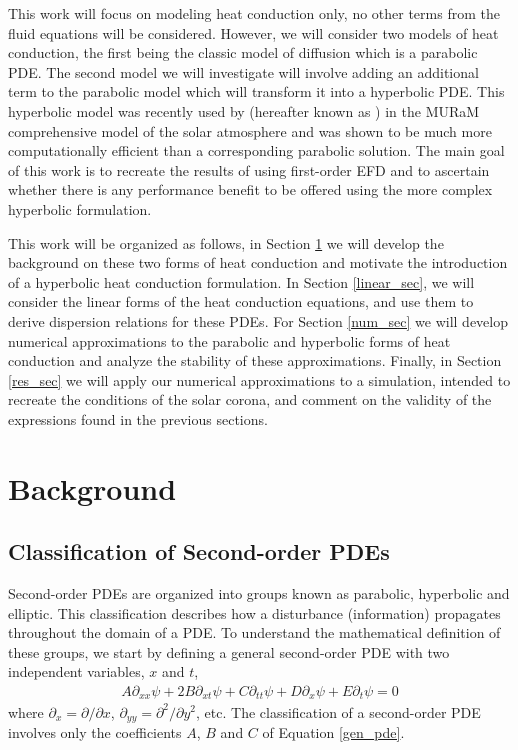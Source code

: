 \documentclass[iop]{emulateapj}
\begin{document}
		This work will focus on modeling heat conduction only, no other terms from the fluid equations will be considered.
			However, we will consider two models of heat conduction, the first being the classic model of diffusion which is a parabolic \ac{PDE}.
			The second model we will investigate will involve adding an additional term to the parabolic model which will transform it into a hyperbolic \ac{PDE}.
			This hyperbolic model was recently used by \cite{A} (hereafter known as ) in the MURaM comprehensive model of the solar atmosphere and was shown to be much more computationally efficient than a corresponding parabolic solution.
			The main goal of this work is to recreate the results of  using first-order \ac{EFD} and to ascertain whether there is any performance benefit to be offered using the more complex hyperbolic formulation.
		
		This work will be organized as follows, in Section \ref{back_sec} we will develop the background on these two forms of heat conduction and motivate the introduction of a hyperbolic heat conduction formulation.
			In Section \ref{linear_sec}, we will consider the linear forms of the heat conduction equations, and use them to derive dispersion relations for these \acp{PDE}.
			For Section \ref{num_sec} we will develop numerical approximations to the parabolic and hyperbolic forms of heat conduction and analyze the stability of these approximations.
			Finally, in Section \ref{res_sec} we will apply our numerical approximations to a simulation, intended to recreate the conditions of the solar corona, and comment on the validity of the expressions found in the previous sections.
			
	
	\section{Background} \label{back_sec}
		\subsection{Classification of Second-order PDEs}
			Second-order PDEs are organized into groups known as parabolic, hyperbolic and elliptic.
				This classification describes how a disturbance (information) propagates throughout the domain of a \ac{PDE}.
				To understand the mathematical definition of these groups, we start by defining a general second-order \ac{PDE} with two independent variables, $x$ and $t$,
				\begin{align}
					A \partial_{xx} \psi + 2 B \partial_{xt} \psi + C \partial_{tt} \psi + D \partial_x \psi + E \partial_t \psi = 0 \label{gen_pde}
				\end{align}
				where $\partial_x = \partial / \partial x$, $\partial_{yy} = \partial^2 / \partial y^2$, etc.
				The classification of a second-order \ac{PDE} involves only the coefficients $A$, $B$ and $C$ of Equation \ref{gen_pde}.
				
\end{document}

